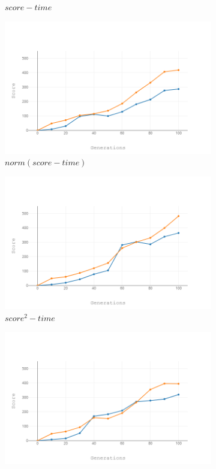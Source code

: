 \documentclass[a4paper,12pt,pagesize,headsepline,bibtotoc,titlepage,abstracton]{scrartcl}
\begin{document}
\begin{figure}[hbp]
\begin{center}
\begin{subfigure}[b]{0.45\textwidth}
    \caption{$score - time$}
\end{subfigure}
\begin{subfigure}[b]{0.45\textwidth}
    \includegraphics[width=\textwidth]{images/normscoreminustime.png}
    \caption{$norm(score - time)$}
\end{subfigure}
\begin{subfigure}[b]{0.45\textwidth}
    \includegraphics[width=\textwidth]{images/scoresquared.png}
    \caption{$score^2 - time$}
\end{subfigure}
\begin{subfigure}[b]{0.45\textwidth}
    \includegraphics[width=\textwidth]{images/normscoresquared.png}

\end{subfigure}
\end{center}
\end{figure}
\end{document}
